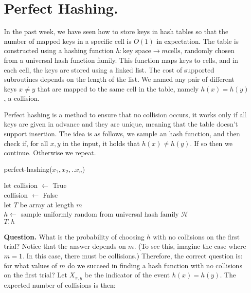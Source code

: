 \section{Perfect Hashing.}
In the past week, we have seen how to store keys in hash tables so that the number of mapped keys in a specific cell is $O(1)$ in expectation. The table is constructed using a hashing function $h : \text{key space} \rightarrow m \text{cells}$, randomly chosen from a universal hash function family. This function maps keys to cells, and in each cell, the keys are stored using a linked list. The cost of supported subroutines depends on the length of the list. We named any pair of different keys $x\neq y$ that are mapped to the same cell in the table, namely $h(x) = h(y)$, a collision.

Perfect hashing is a method to ensure that no collision occurs, it works only if all keys are given in advance and they are unique, meaning that the table doesn't support insertion. The idea is as follows, we sample an hash function, and then check if, for all $x,y$ in the input, it holds that $h(x)\neq h(y)$. If so then we continue. Otherwise we repeat. 

  \begin{algorithm}
  \caption{perfect-hashing($x_{1},x_{2},..x_{n}$)}
  let collision $\leftarrow$ True\\
   {
    collision $\leftarrow$ False\\
    let $T$ be array at length $m$ \\
    $h \leftarrow $ sample uniformly random from universal hash family $\mathcal{H}$\\
  }
  \Return $T,h$
  \end{algorithm}

  \textbf{Question.} What is the probability of choosing $h$ with no collisions on the first trial? Notice that the answer depends on $m$. (To see this, imagine the case where $m=1$. In this case, there must be collisions.) Therefore, the correct question is: for what values of $m$ do we succeed in finding a hash function with no collisions on the first trial? Let $X_{x,y}$ be the indicator of the event $h(x)=h(y)$. The expected number of collisions is then:


